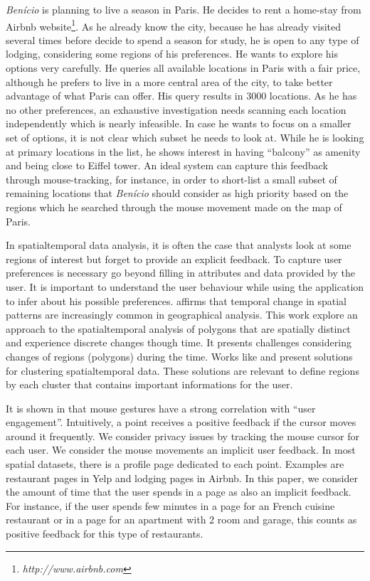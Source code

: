 \documentclass[runningheads,a4paper]{llncs}
\begin{document}
\begin{example}
\label{ex:benicio}
\textit{Ben\'icio} is planning to live a season in Paris. He decides to rent a home-stay from Airbnb website\footnote{\it http://www.airbnb.com}. As he already know the city, because he has already visited several times before decide to spend a season for study, he is open to any type of lodging, considering some regions of his preferences. He wants to explore his options very carefully. He queries all available locations in Paris with a fair price, although he prefers to live in a more central area of the city, to take better advantage of what Paris can offer. His query results in 3000 locations. As he has no other preferences, an exhaustive investigation needs scanning each location independently which is nearly infeasible. In case he wants to focus on a smaller set of options, it is not clear which subset he needs to look at. While he is looking at primary locations in the list, he shows interest in having ``balcony'' as amenity and being close to Eiffel tower. An ideal system can capture this feedback through mouse-tracking, for instance, in order to short-list a small subset of remaining locations that \textit{Ben\'icio} should consider as high priority based on the regions  which he searched through the mouse movement made on the map of Paris. 
\end{example}

In spatialtemporal data analysis, it is often the case that analysts look at some regions of interest but forget to provide an explicit feedback. To capture user preferences is necessary go beyond filling in attributes and data provided by the user. It is important to understand the user behaviour while using the application to infer about his possible preferences. \cite{Robertson2007}  affirms that temporal change in spatial patterns are increasingly common in geographical analysis. This work explore an approach to the spatialtemporal analysis of polygons that are spatially distinct and experience discrete changes though time. It presents challenges considering changes of regions (polygons) during the time. Works like \cite{Ester:1996} and  \cite{Birant:2007} present solutions for clustering spatialtemporal data. These solutions are relevant to define regions by each cluster that contains important informations for the user. 

It is shown in \cite{Arapakis:2014} that mouse gestures have a strong correlation with ``user engagement''. Intuitively, a point receives a positive feedback if the cursor moves around it frequently. We consider privacy issues by tracking the mouse cursor for each user. We consider the mouse movements an implicit user feedback. In most spatial datasets, there is a profile page dedicated to each point. Examples are restaurant pages in Yelp and lodging pages in Airbnb. In this paper, we consider the amount of time that the user spends in a page as also an implicit feedback. For instance, if the user spends few minutes in a page for an French cuisine restaurant or in a page for an apartment with 2 room and garage, this counts as positive feedback for this type of restaurants.
\end{document}
